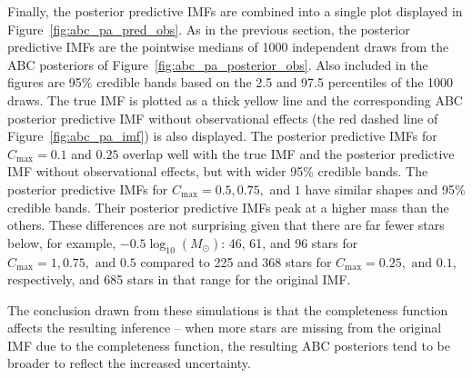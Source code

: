 \documentclass[ejs]{imsart}
\numberwithin{equation}{section}
\theoremstyle{plain}
\newcommand{\Msun}{M_{\odot}}
\newcommand{\Cmax}{C_{\text{max}}}
\begin{document}
Finally, the posterior predictive IMFs are combined into a single plot displayed in Figure~\ref{fig:abc_pa_pred_obs}.  As in the previous section, the posterior predictive IMFs are the pointwise medians of 1000 independent draws from the ABC posteriors of Figure~\ref{fig:abc_pa_posterior_obs}.  Also included in the figures are 95\% credible bands based on the 2.5 and 97.5 percentiles of the 1000 draws.  The true IMF is plotted as a thick yellow line and the corresponding ABC posterior predictive IMF without observational effects (the red dashed line of Figure~\ref{fig:abc_pa_imf}) is also displayed.
The posterior predictive IMFs for $\Cmax = 0.1$ and $0.25$ overlap well with the true IMF and the posterior predictive IMF without observational effects, but with wider 95\% credible bands.
The posterior predictive IMFs for $\Cmax = 0.5, 0.75,$ and $1$ have similar shapes and 95\% credible bands.  
Their posterior predictive IMFs peak at a higher mass than the others.  These differences are not surprising given that there are far fewer stars below, for example, $-0.5 \log_{10}(\Msun)$:  
46, 61, and 96 stars for $\Cmax = 1, 0.75, \text{ and } 0.5$ compared to 225 and 368 stars for $\Cmax = 0.25, \text{ and } 0.1$, respectively, and 685 stars in that range for the original IMF.

The conclusion drawn from these simulations is that the completeness function affects the resulting inference -- when more stars are missing from the original IMF due to the completeness function, the resulting ABC posteriors tend to be broader to reflect the increased uncertainty. 
\end{document}
